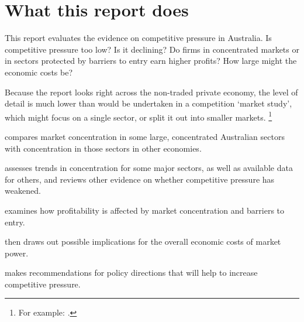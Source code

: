 \newpage
\section{What this report does}

This report evaluates the evidence on competitive pressure in Australia. Is competitive pressure too low? Is it declining? Do firms in concentrated markets or in sectors protected by barriers to entry earn higher profits? How large might the economic costs be? 

Because the report looks right across the non-traded private economy, the level of detail is much lower than would be undertaken in a competition `market study', which might focus on a single sector, or split it out into smaller markets.%
\footnote{For example: \textcites{ACCCCommsMarketStudyDraft2017}{ACCCNewCarMarketStudyDraft2017}.}

 compares market concentration in some large, concentrated Australian sectors with concentration in those sectors in other economies.


 assesses trends in concentration for some major sectors, as well as available data for others, and reviews other evidence on whether competitive pressure has weakened.

 examines how profitability is affected by market concentration and barriers to entry.%


 then draws out possible implications for the overall economic costs of market power.

 makes recommendations for policy directions that will help to increase competitive pressure. 


